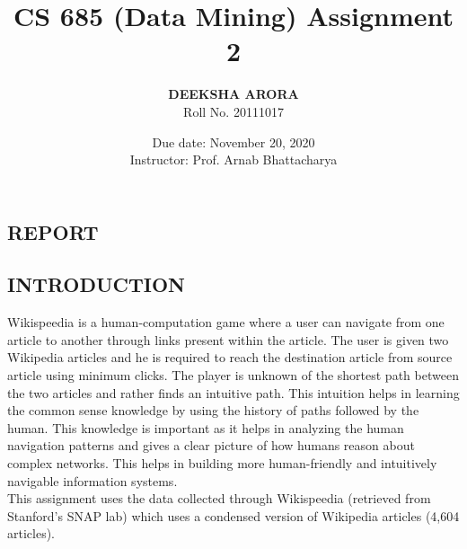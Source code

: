 \documentclass{article}
\title{CS 685 (Data Mining)
Assignment 2}
\author{\textbf{DEEKSHA ARORA} \\ Roll No. 20111017}
\date{Due date: November 20, 2020 \\ Instructor: Prof. Arnab Bhattacharya}
\begin{document}
\maketitle
\pagebreak
\lstset{style=mystyle}
\begin{center}
\section{{REPORT}}
\end{center}
\subsection{INTRODUCTION}
Wikispeedia is a human-computation game where a user can navigate from one article to another through links present within the article. The user is given two Wikipedia articles and he is required to reach the destination article from source article using minimum clicks. The player is unknown of the shortest path between the two articles and rather finds an intuitive path. This intuition helps in learning the common sense knowledge by using the history of paths followed by the human. This knowledge is important as it helps in analyzing the human navigation patterns and gives a clear picture of how humans reason about complex networks. This helps in building more human-friendly and intuitively navigable information systems. \\
This assignment uses the data collected through Wikispeedia (retrieved from Stanford's SNAP lab) which uses a condensed version of Wikipedia articles (4,604 articles).
\end{document}

